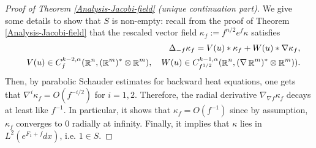 \documentclass[a4paper,11pt,reqno]{amsart}
\def\R{\mathop{\rm \mathbb{R}}\nolimits}
\begin{document}
\begin{proof}[Proof of Theorem \ref{Analysis-Jacobi-field} (unique continuation part)]
We give some details to show that $S$ is non-empty: recall from the proof of Theorem \ref{Analysis-Jacobi-field} that the rescaled vector field $\kappa_f:=f^{n/2}e^f\kappa$ satisfies 
\begin{eqnarray}
&&\Delta_{-f}\kappa_f=V(u)\ast\kappa_f+W(u)\ast\nabla \kappa_f,\label{back-heat-eq-resc-jac-fiel-bis}\\
&&V(u)\in C_{f}^{k-2,\alpha}(\R^n,(\R^m)^*\otimes\R^m),\quad W(u)\in C_{f^{1/2}}^{k-1,\alpha}(\R^n,(\nabla \R^m)^*\otimes\R^m)).\label{pot-bac-heat-eq-bis}
\end{eqnarray}
Then, by parabolic Schauder estimates for backward heat equations, one gets that $\nabla^i\kappa_f=\textit{O}(f^{-i/2})$ for $i=1,2$. Therefore, the radial derivative $\nabla_{\nabla f}\kappa_f$ decays at least like $f^{-1}$. In particular, it shows that $\kappa_f=\textit{O}(f^{-1})$ since by assumption, $\kappa_f$ converges to $0$ radially at infinity. Finally, it implies that $\kappa$ lies in $L^2(e^{F_1+f}dx)$, i.e. $1\in S$.
\end{proof}
\end{document}
